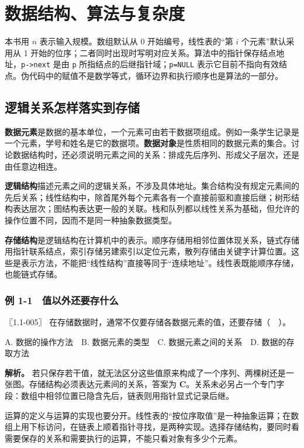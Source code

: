 \chapter{数据结构、算法与复杂度}\label{ds-ch1}

本书用 \(n\) 表示输入规模。数组默认从 0 开始编号，线性表的``第 \(i\) 个元素''默认采用从 1 开始的位序；二者同时出现时写明对应关系。算法中的指针保存结点地址，\texttt{p-\textgreater{}next} 是由 \texttt{p} 所指结点的后继指针域；\texttt{p=NULL} 表示它目前不指向有效结点。伪代码中的赋值不是数学等式，循环边界和执行顺序也是算法的一部分。

\section{逻辑关系怎样落实到存储}\label{ds-01-01}

\textbf{数据元素}是数据的基本单位，一个元素可由若干数据项组成。例如一条学生记录是一个元素，学号和姓名是它的数据项。\textbf{数据对象}是性质相同的数据元素的集合。讨论数据结构时，还必须说明元素之间的关系：排成先后序列、形成父子层次，还是由任意边相连。

\textbf{逻辑结构}描述元素之间的逻辑关系，不涉及具体地址。集合结构没有规定元素间的先后关系；线性结构中，除首尾外每个元素各有一个直接前驱和直接后继；树形结构表达层次；图结构表达更一般的关联。栈和队列都以线性关系为基础，但允许的操作位置不同，因而不是同一种抽象数据类型。

\textbf{存储结构}是逻辑结构在计算机中的表示。顺序存储用相邻位置体现关系，链式存储用指针联系结点，索引存储另建索引以定位元素，散列存储由关键字计算位置。这些是表示方法，不能把``线性结构''直接等同于``连续地址''。线性表既能顺序存储，也能链式存储。

\subsection{例 1-1　值以外还要存什么}\label{ds-ex1-1}

\noindent{}〖1.1-005〗 在存储数据时，通常不仅要存储各数据元素的值，还要存储（　）。

A. 数据的操作方法　B. 数据元素的类型　C. 数据元素之间的关系　D. 数据的存取方法


\textbf{解析。} 若只保存若干值，就无法区分这些值原来构成了一个序列、两棵树还是一张图。存储结构必须表达元素间的关系，答案为 \textbf{C}。关系未必另占一个专门字段：数组中相邻位置已隐含先后，链表则用指针显式记录后继。

运算的定义与运算的实现也要分开。线性表的``按位序取值''是一种抽象运算；在数组上用下标访问，在链表上顺着指针寻找，是两种实现。选择存储结构，要同时看需要保存的关系和需要执行的运算，不能只看对象有多少个元素。

